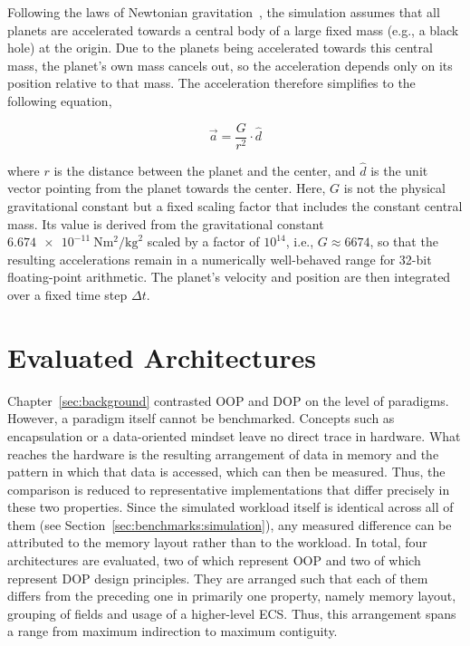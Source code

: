 Following the laws of Newtonian gravitation~\cite{kleppner2014mechanics}, the simulation assumes that all planets are accelerated towards a central body of a large fixed mass (e.g., a black hole) at the origin. Due to the planets being accelerated towards this central mass, the planet's own mass cancels out, so the acceleration depends only on its position relative to that mass. The acceleration therefore simplifies to the following equation,

$$\vec{a} = \frac{G}{r^2} \cdot \hat{d}$$

where $r$ is the distance between the planet and the center, and $\hat{d}$ is the unit vector pointing from the planet towards the center. Here, $G$ is not the physical gravitational constant but a fixed scaling factor that includes the constant central mass. Its value is derived from the gravitational constant $\qty{6.674e-11}{\newton\meter\squared\per\kilogram\squared}$ scaled by a factor of $10^{14}$, i.e., $G \approx \num{6674}$, so that the resulting accelerations remain in a numerically well-behaved range for \num{32}-bit floating-point arithmetic. The planet's velocity and position are then integrated over a fixed time step $\Delta t$.

\section{Evaluated Architectures}
\label{sec:benchmarks:architectures}
Chapter~\ref{sec:background} contrasted \ac{OOP} and \ac{DOP} on the level of paradigms. However, a paradigm itself cannot be benchmarked. Concepts such as
encapsulation or a data-oriented mindset leave no direct trace in hardware. What reaches the hardware is the resulting arrangement of data in memory and the
pattern in which that data is accessed, which can then be measured. Thus, the comparison is reduced to representative implementations that differ precisely in these two properties. Since the simulated workload itself is identical across all of them (see Section~\ref{sec:benchmarks:simulation}), any measured difference can be attributed to the memory layout rather than to the workload. In total, four architectures are evaluated, two of which represent \ac{OOP} and two of which represent \ac{DOP} design principles. They are arranged such that each of them differs from the preceding one in primarily one property, namely memory layout, grouping of fields and usage of a higher-level \ac{ECS}. Thus, this arrangement spans a range from maximum indirection to maximum contiguity. 

